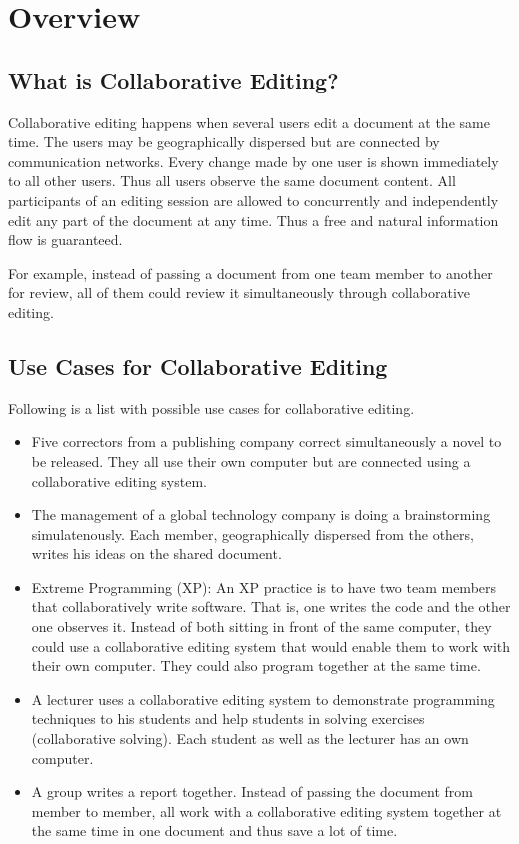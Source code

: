 \chapter{Overview}
\label{chapter:overview}



\section{What is Collaborative Editing?}
Collaborative editing happens when several users edit a document at the same time. The users may be geographically dispersed but are connected by communication networks. Every change made by one user is shown immediately to all other users. Thus all users observe the same document content. All participants of an editing session are allowed to concurrently and independently edit any part of the document at any time. Thus a free and natural information flow is guaranteed. 

For example, instead of passing a document from one team member to another for review, all of  them could review it simultaneously through collaborative editing.



\section{Use Cases for Collaborative Editing}
Following is a list with possible use cases for collaborative editing.

\begin{itemize}
\item Five correctors from a publishing company correct simultaneously a novel to be released. They all use their own computer but are connected using a collaborative editing system.
\item The management of a global technology company is doing a brainstorming simulatenously. Each member, geographically dispersed from the others, writes his ideas on the shared document.
\item Extreme Programming (XP): An XP practice is to have two team members that collaboratively write software. That is, one writes the code and the other one observes it. Instead of both sitting in front of the same computer, they could use a collaborative editing system that would enable them to work with their own computer. They could also program together at the same time.
\item A lecturer uses a collaborative editing system to demonstrate programming techniques to his students and help students in solving exercises (collaborative solving). Each student as well as the lecturer has an own computer.
\item A group writes a report together. Instead of passing the document from member to member, all work with a collaborative editing system together at the same time in one document and thus save a lot of time.
\end{itemize}



